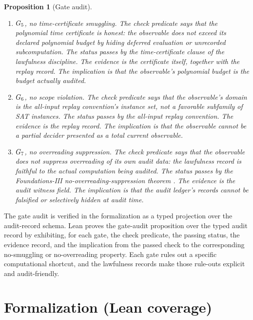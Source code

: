 \documentclass[11pt]{article}
\newtheorem{proposition}[theorem]{Proposition}
\theoremstyle{definition}
\begin{document}
\begin{proposition}[Gate audit]
\begin{enumerate}
  \item \(G_{5}\), \emph{no time-certificate smuggling}.  The
  check predicate says that the polynomial time certificate is honest:
  the observable does not exceed its declared polynomial budget by
  hiding deferred evaluation or unrecorded subcomputation.  The status
  passes by the time-certificate clause of the lawfulness discipline.
  The evidence is the certificate itself, together with the replay
  record.  The implication is that the observable's polynomial budget
  is the budget actually audited.

  \item \(G_{6}\), \emph{no scope violation}.  The check predicate
  says that the observable's domain is the all-input replay
  convention's instance set, not a favorable subfamily of SAT
  instances.  The status passes by the all-input replay convention.
  The evidence is the replay record.  The implication is that the
  observable cannot be a partial decider presented as a total current
  observable.

  \item \(G_{7}\), \emph{no overreading suppression}.  The check
  predicate says that the observable does not suppress overreading of
  its own audit data: the lawfulness record is faithful to the actual
  computation being audited.  The status passes by the Foundations-III
  no-overreading-suppression theorem
  \citep{TsiokosFoundationsIII2026}.  The evidence is the audit
  witness field.  The implication is that the audit ledger's records
  cannot be falsified or selectively hidden at audit time.
\end{enumerate}
\end{proposition}

The gate audit is verified in the formalization as a typed projection
over the audit-record schema.  Lean proves the gate-audit proposition
over the typed audit record by exhibiting, for each gate, the check
predicate, the passing status, the evidence record, and the implication
from the passed check to the corresponding no-smuggling or
no-overreading property.  Each gate rules out a specific computational
shortcut, and the lawfulness records make those rule-outs explicit and
audit-friendly.
 

\section{Formalization (Lean coverage)}
\label{app:formalization}
\end{document}
